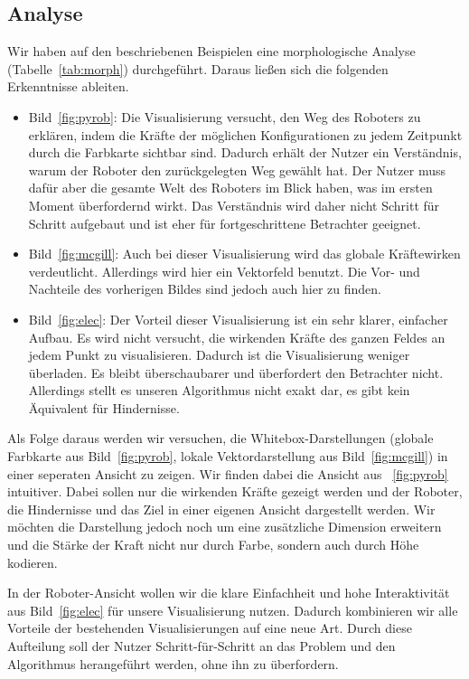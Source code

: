 \subsection{Analyse}
Wir haben auf den beschriebenen Beispielen eine morphologische Analyse (Tabelle~\vref{tab:morph}) durchgeführt. Daraus ließen sich die folgenden Erkenntnisse ableiten.
\begin{itemize}
    \item Bild~\vref{fig:pyrob}: Die Visualisierung versucht, den Weg des Roboters zu erklären, indem die Kräfte der möglichen Konfigurationen zu jedem Zeitpunkt durch die Farbkarte sichtbar sind. Dadurch erhält der Nutzer ein Verständnis, warum der Roboter den zurückgelegten Weg gewählt hat. Der Nutzer muss dafür aber die gesamte Welt des Roboters im Blick haben, was im ersten Moment überfordernd wirkt. Das Verständnis wird daher nicht Schritt für Schritt aufgebaut und ist eher für fortgeschrittene Betrachter geeignet.
    \item Bild~\vref{fig:mcgill}: Auch bei dieser Visualisierung wird das globale Kräftewirken verdeutlicht. Allerdings wird hier ein Vektorfeld benutzt. Die Vor- und Nachteile des vorherigen Bildes sind jedoch auch hier zu finden. 
    \item Bild~\vref{fig:elec}: Der Vorteil dieser Visualisierung ist ein sehr klarer, einfacher Aufbau. Es wird nicht versucht, die wirkenden Kräfte des ganzen Feldes an jedem Punkt zu visualisieren. Dadurch ist die Visualisierung weniger überladen. Es bleibt überschaubarer und überfordert den Betrachter nicht. Allerdings stellt es unseren Algorithmus nicht exakt dar, es gibt kein Äquivalent für Hindernisse.
\end{itemize}

Als Folge daraus werden wir versuchen, die Whitebox-Darstellungen (globale Farbkarte aus Bild~\vref{fig:pyrob}, lokale Vektordarstellung aus Bild~\vref{fig:mcgill}) in einer seperaten Ansicht zu zeigen. 
Wir finden dabei die Ansicht aus ~\vref{fig:pyrob} intuitiver. 
Dabei sollen nur die wirkenden Kräfte gezeigt werden und der Roboter, die Hindernisse und das Ziel in einer eigenen Ansicht dargestellt werden.
Wir möchten die Darstellung jedoch noch um eine zusätzliche Dimension erweitern und die Stärke der Kraft nicht nur durch Farbe, sondern auch durch Höhe kodieren.

In der Roboter-Ansicht wollen wir die klare Einfachheit und hohe Interaktivität aus Bild~\vref{fig:elec} für unsere Visualisierung nutzen. Dadurch kombinieren wir alle Vorteile der bestehenden Visualisierungen auf eine neue Art.
Durch diese Aufteilung soll der Nutzer Schritt-für-Schritt an das Problem und den Algorithmus herangeführt werden, ohne ihn zu überfordern.


